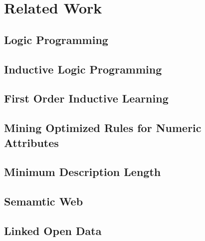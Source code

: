 \chapter{Related Work}
\label{rw:intro}

\section{Logic Programming}
\section{Inductive Logic Programming}
\section{First Order Inductive Learning}
\section{Mining Optimized Rules for Numeric Attributes}

\cite{Brin99miningoptimized}

\section{Minimum Description Length}

\cite{DBLP:conf/sac/CaldersGPR09}

\section{Semamtic Web}
\section{Linked Open Data}